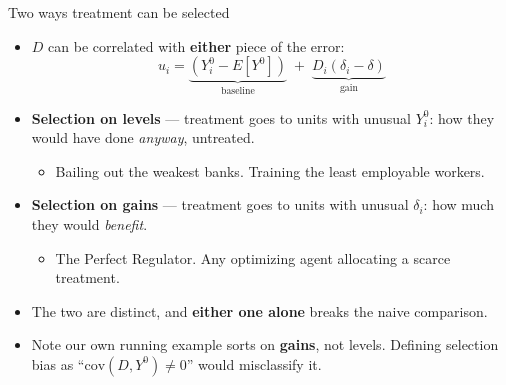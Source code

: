 \documentclass[
  11pt,
  ignorenonframetext,
  aspectratio=169,
]{beamer}
\providecommand{\tightlist}{%
  \setlength{\itemsep}{0pt}\setlength{\parskip}{0pt}}
\begin{document}
\begin{frame}{Two ways treatment can be selected}
\protect{}\label{two-ways-treatment-can-be-selected}
\begin{itemize}
\tightlist
\item
  \(D\) can be correlated with \textbf{either} piece of the error: \[
  u_i = \underbrace{\left(Y_i^0 - E[Y^0]\right)}_{\text{baseline}} \;+\; \underbrace{D_i(\delta_i - \delta)}_{\text{gain}}
  \]
\item
  \textbf{Selection on levels} --- treatment goes to units with unusual
  \(Y_i^0\): how they would have done \emph{anyway}, untreated.

  \begin{itemize}
  \tightlist
  \item
    Bailing out the weakest banks. Training the least employable
    workers.
  \end{itemize}
\item
  \textbf{Selection on gains} --- treatment goes to units with unusual
  \(\delta_i\): how much they would \emph{benefit}.

  \begin{itemize}
  \tightlist
  \item
    The Perfect Regulator. Any optimizing agent allocating a scarce
    treatment.
  \end{itemize}
\item
  The two are distinct, and \textbf{either one alone} breaks the naive
  comparison.
\item
  Note our own running example sorts on \textbf{gains}, not levels.
  Defining selection bias as ``\(\mathrm{cov}(D,Y^0) \neq 0\)'' would
  misclassify it.
\end{itemize}
\end{frame}
\end{document}
